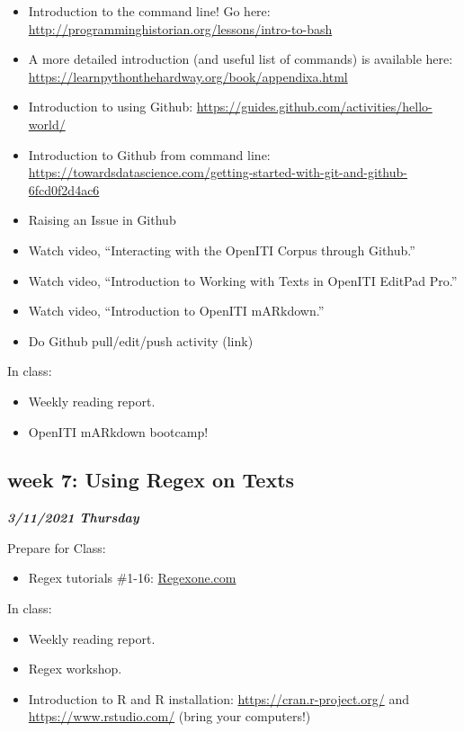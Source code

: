 \documentclass[
]{book}
\providecommand{\tightlist}{%
  \setlength{\itemsep}{0pt}\setlength{\parskip}{0pt}}
\begin{document}
\begin{itemize}
\tightlist
\item
  Introduction to the command line! Go here: \url{http://programminghistorian.org/lessons/intro-to-bash}
\item
  A more detailed introduction (and useful list of commands) is available here: \url{https://learnpythonthehardway.org/book/appendixa.html}
\item
  Introduction to using Github: \url{https://guides.github.com/activities/hello-world/}
\item
  Introduction to Github from command line: \url{https://towardsdatascience.com/getting-started-with-git-and-github-6fcd0f2d4ac6}
\item
  Raising an Issue in Github
\item
  Watch video, ``Interacting with the OpenITI Corpus through Github.''
\item
  Watch video, ``Introduction to Working with Texts in OpenITI EditPad Pro.''
\item
  Watch video, ``Introduction to OpenITI mARkdown.''
\item
  Do Github pull/edit/push activity (link)
\end{itemize}

In class:

\begin{itemize}
\tightlist
\item
  Weekly reading report.
\item
  OpenITI mARkdown bootcamp!
\end{itemize}

\hypertarget{week-7-using-regex-on-texts}{%
\subsection{week 7: Using Regex on Texts}\label{week-7-using-regex-on-texts}}

\textbf{\emph{3/11/2021 Thursday}}

Prepare for Class:

\begin{itemize}
\tightlist
\item
  Regex tutorials \#1-16: \url{Regexone.com}
\end{itemize}

In class:

\begin{itemize}
\tightlist
\item
  Weekly reading report.
\item
  Regex workshop.
\item
  Introduction to R and R installation: \url{https://cran.r-project.org/} and \url{https://www.rstudio.com/} (bring your computers!)
\end{itemize}
\end{document}
